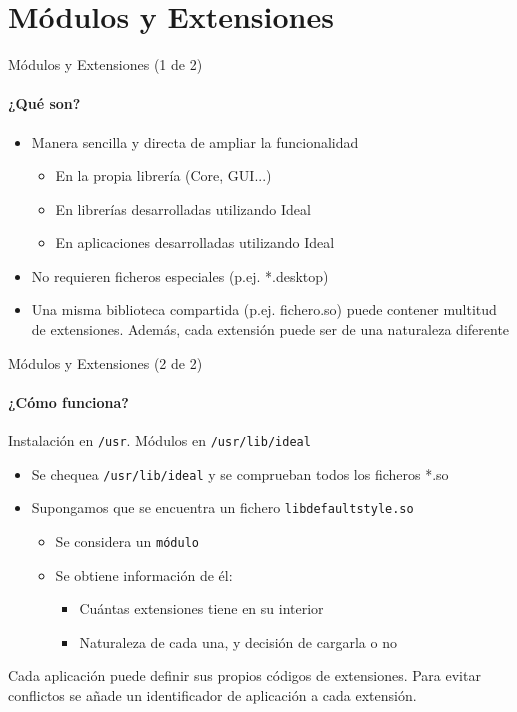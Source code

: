 \documentclass{beamer}
\begin{document}
\section{Módulos y Extensiones}

\begin{frame}{Módulos y Extensiones (1 de 2)}
  \framesubtitle{¿Qué son?}
  \begin{itemize}
    \item Manera sencilla y directa de ampliar la funcionalidad
    \begin{itemize}
      \item En la propia librería (Core, GUI...)
      \item En librerías desarrolladas utilizando Ideal
      \item En aplicaciones desarrolladas utilizando Ideal
    \end{itemize}
    \pause
    \medskip
    \item No requieren ficheros especiales (p.ej. *.desktop)
    \pause
    \medskip
    \item Una misma biblioteca compartida (p.ej. fichero.so) puede contener multitud de extensiones.
          Además, cada extensión puede ser de una naturaleza diferente
  \end{itemize}
\end{frame}

\begin{frame}{Módulos y Extensiones (2 de 2)}
  \framesubtitle{¿Cómo funciona?}
  Instalación en \texttt{/usr}. Módulos en \texttt{/usr/lib/ideal}
  \begin{itemize}
    \item Se chequea \texttt{/usr/lib/ideal} y se comprueban todos los ficheros *.so
    \medskip
    \item Supongamos que se encuentra un fichero \texttt{libdefaultstyle.so}
    \begin{itemize}
      \item Se considera un \texttt{módulo}
      \item Se obtiene información de él:
      \begin{itemize}
        \item Cuántas extensiones tiene en su interior
        \item Naturaleza de cada una, y decisión de cargarla o no
      \end{itemize}
    \end{itemize}
  \end{itemize}
  \medskip
  Cada aplicación puede definir sus propios códigos de extensiones. Para evitar conflictos se añade
  un identificador de aplicación a cada extensión.
\end{frame}
\end{document}
